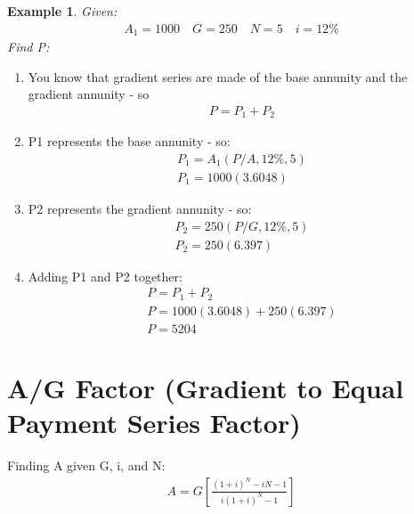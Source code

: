 \documentclass{report} %
\newtheorem{exmp}{Example}
\begin{document}
\begin{exmp}
    Given:
    \begin{equation*}
        \begin{aligned}
            A_1 = 1000 \quad G = 250 \quad N = 5 \quad i = 12\%
        \end{aligned}
    \end{equation*}
    Find P:
\end{exmp}
\begin{enumerate}
    \item You know that gradient series are made of the base annunity and the gradient annunity - so 
    \begin{equation*}
        \begin{aligned}
            P = P_1 + P_2
        \end{aligned}
    \end{equation*}
    \item P1 represents the base annunity - so:
    \begin{equation*}
        \begin{aligned}
            P_1 = A_1(P/A,12\%,5) \\
            P_1 = 1000(3.6048)
        \end{aligned}
    \end{equation*}
    \item P2 represents the gradient annunity - so:
    \begin{equation*}
        \begin{aligned}
            P_2 = 250(P/G,12\%,5) \\
            P_2 = 250(6.397)
        \end{aligned}
    \end{equation*}
    \item Adding P1 and P2 together:
    \begin{equation*}
        \begin{aligned}
            P = P_1 + P_2 \\
            P = 1000(3.6048) + 250(6.397) \\
            P = 5204
        \end{aligned}
    \end{equation*}
\end{enumerate}

\section*{A/G Factor (Gradient to Equal Payment Series Factor)}
Finding A given G, i, and N:
\begin{equation*}
    \begin{aligned}
        A = G\left[\frac{(1+i)^N - iN -1}{i(1+i)^N - 1}\right] \\
    \end{aligned}
\end{equation*}
\end{document}

